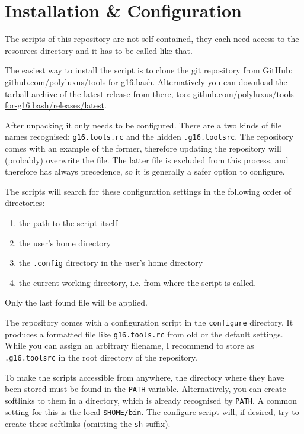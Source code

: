 \documentclass[   %
  final,          %
  a4paper         %
]{article}
\begin{document}
\section{Installation \& Configuration}

The scripts of this repository are not self-contained,
they each need access to the resources directory 
and it has to be called like that.

The easiest way to install the script is to clone the git repository from GitHub:\newline
\href{https://github.com/polyluxus/tools-for-g16.bash}{github.com/polyluxus/tools-for-g16.bash}.
Alternatively you can download the tarball archive of the latest release from there, too:\newline
\href{https://github.com/polyluxus/tools-for-g16.bash/releases/latest}{github.com/polyluxus/tools-for-g16.bash/releases/latest}.

After unpacking it only needs to be configured.
There are a two kinds of file names recognised:
\lstinline`g16.tools.rc` and the hidden \lstinline`.g16.toolsrc`.
The repository comes with an example of the former, 
therefore updating the repository will (probably) overwrite the file.
The latter file is excluded from this process,
and therefore has always precedence, 
so it is generally a safer option to configure.

The scripts will search for these configuration settings in the following order of directories:
\begin{enumerate}
  \item the path to the script itself 
  \item the user's home directory
  \item the \texttt{.config} directory in the user's home directory
  \item the current working directory, i.e. from where the script is called.
\end{enumerate}
Only the last found file will be applied.

The repository comes with a configuration script in the \texttt{configure} directory.
It produces a formatted file like \lstinline`g16.tools.rc` from old or the default settings.
While you can assign an arbitrary filename, 
I recommend to store as \lstinline`.g16.toolsrc` in the root directory of the repository.

To make the scripts accessible from anywhere, the directory where they have been stored
must be found in the \texttt{PATH} variable.
Alternatively, you can create softlinks to them in a directory, 
which is already recognised by \texttt{PATH}.
A common setting for this is the local \texttt{\$HOME/bin}.
The configure script will, if desired, try to create these softlinks (omitting the \texttt{sh} suffix).
\end{document}
